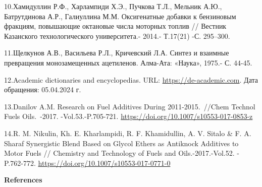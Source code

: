 \begin{references}
10.Хамидуллин Р.Ф., Харлампиди Х.Э., Пучкова Т.Л., Мельник А.Ю.,
Батрутдинова А.Р., Галиуллина М.М. Оксигенатные добавки к бензиновым
фракциям, повышающие октановые числа моторных топлив // Вестник
Казанского технологического университета.- 2014.- Т.17(21) -С. 295--300.

11.Щелкунов А.В., Васильева Р.Л., Кричевский Л.А. Синтез и взаимные
превращения монозамещенных ацетиленов. Алма-Ата: «Наука», 1975.- С.
44-45.

12.Academic dictionaries and encyclopedias. URL:
\href{https://de-academic.com/dic.nsf/dewiki/411193}{https://de-academic.com}. Дата обращения:
05.04.2024 г.

13.Danilov A.M. Research on Fuel Additives During 2011-2015.~//Chem
Technol Fuels Oils.~-2017. -Vol.53.-P.705-721.
\url{https://doi.org/10.1007/s10553-017-0853-z}

14.R. M. Nikulin, Kh. E. Kharlampidi, R. F. Khamidullin, A. V. Sitalo \&
F. A. Sharaf Synergistic Blend Based on Glycol Ethers as Antiknock
Additives to Motor Fuels // Chemistry and Technology of Fuels and
Oils.-2017.-Vol.52. - P.762-772.
\url{https://doi.org/10.1007/s10553-017-0771-0}
\end{references}

\begin{center}
{\bfseries References}
\end{center}

